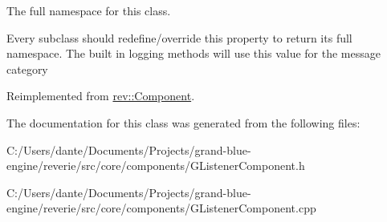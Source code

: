 The full namespace for this class. 

Every subclass should redefine/override this property to return its full namespace. The built in logging methods will use this value for the message category 

Reimplemented from \mbox{\hyperlink{classrev_1_1_component_ae2827b14c278588b95e01c4743fae674}{rev\+::\+Component}}.



The documentation for this class was generated from the following files\+:\begin{DoxyCompactItemize}
\item 
C\+:/\+Users/dante/\+Documents/\+Projects/grand-\/blue-\/engine/reverie/src/core/components/G\+Listener\+Component.\+h\item 
C\+:/\+Users/dante/\+Documents/\+Projects/grand-\/blue-\/engine/reverie/src/core/components/G\+Listener\+Component.\+cpp\end{DoxyCompactItemize}
